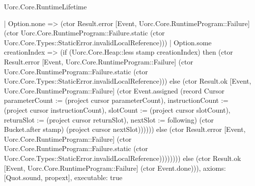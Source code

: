 \begin{lexlean}{Uorc.Core.RuntimeLifetime}
\begin{semanticmodule}
{          | Option.none => (ctor Result.error [Event, Uorc.Core.RuntimeProgram::Failure] (ctor Uorc.Core.RuntimeProgram::Failure.static (ctor Uorc.Core.Types::StaticError.invalidLocalReference)))
          | Option.some creationIndex => (if (Uorc.Core.Heap::less stamp creationIndex) then (ctor Result.error [Event, Uorc.Core.RuntimeProgram::Failure] (ctor Uorc.Core.RuntimeProgram::Failure.static (ctor Uorc.Core.Types::StaticError.invalidLocalReference))) else (ctor Result.ok [Event, Uorc.Core.RuntimeProgram::Failure] (ctor Event.assigned (record Cursor {parameterCount := (project cursor parameterCount), instructionCount := (project cursor instructionCount), slotCount := (project cursor slotCount), returnSlot := (project cursor returnSlot), nextSlot := following}) (ctor Bucket.after stamp) (project cursor nextSlot)))))) else (ctor Result.error [Event, Uorc.Core.RuntimeProgram::Failure] (ctor Uorc.Core.RuntimeProgram::Failure.static (ctor Uorc.Core.Types::StaticError.invalidLocalReference)))))))) else (ctor Result.ok [Event, Uorc.Core.RuntimeProgram::Failure] (ctor Event.done))),
  axioms: [Quot.sound, propext],
  executable: true
}
\end{semanticmodule}
\end{lexlean}
